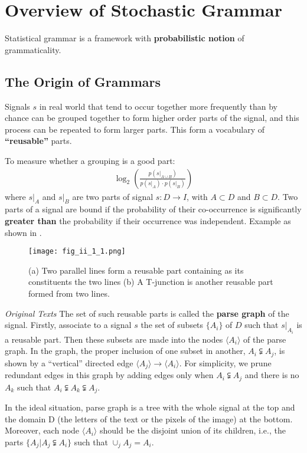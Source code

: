 \documentclass[../Notes_of_CaRiVaC.tex]{subfiles}
\begin{document}
\maketitle
\tableofcontents

\chapter{Overview of Stochastic Grammar}%
\label{sec:ii.1}
Statistical grammar is a framework with \textbf{probabilistic notion} of
grammaticality.

\section{The Origin of Grammars}%
\label{sec:ii.1.1}
Signals $s$ in real world that tend to occur together more frequently than by
chance can be grouped together to form higher order parts of the signal, and
this process can be repeated to form larger parts. This form a vocabulary of
\textbf{``reusable''} parts.

To measure whether a grouping is a good part:
%
\begin{align}
  \label{eq:ii.1.1}
  \log_2 \left( \frac{p(s\vert_{A \cup B})}{p(s\vert_{A}) \cdot p(s\vert_{B})} \right)
\end{align}
%
where $s\vert_{A}$ and $s\vert_{B}$ are two parts of signal $s: D \to I$,
with $A \subset D$ and $B \subset D$. Two parts of a signal are bound if the
probability of their co-occurrence is significantly \textbf{greater than} the
probability if their occurrence was independent. Example as shown in
.
%
\begin{figure}[!htpb]
  \centering
  \texttt{[image: fig\_ii\_1\_1.png]}
  \caption{(a) Two parallel lines form a reusable part containing as its
    constituents the two lines (b) A T-junction is another reusable part formed
    from two lines.}%
  \label{fig:ii.1.1}
\end{figure}
%

\begin{textbox}{\textit{Original Texts}}
  The set of such reusable parts is called the \textbf{parse graph} of the
  signal. Firstly, associate to a signal $s$ the set of subsets $\{A_i\}$ of
  $D$ such that $s\vert_{A_i}$ is a reusable part. Then these subsets are made
  into the nodes $\langle A_i \rangle$ of the parse graph. In the graph, the
  proper inclusion of one subset in another, $A_i \subsetneqq A_j$, is shown by
  a ``vertical'' directed edge
  $\langle A_j \rangle \to \langle A_i \rangle$. For simplicity, we prune
  redundant edges in this graph by adding edges only when $A_i \subsetneqq A_j$
  and there is no $A_k$ such that $A_i \subsetneqq A_k \subsetneqq A_j$.

  \par
  In the ideal situation, parse graph is a tree with the whole signal at the
  top and the domain D (the letters of the text or the pixels of the image) at
  the bottom. Moreover, each node $\langle A_i \rangle$ should be the disjoint
  union of its children, i.e., the parts $\{A_j \vert A_j \subsetneqq A_i\}$
  such that $\cup_j A_j = A_i$.
\end{textbox}
\end{document}
